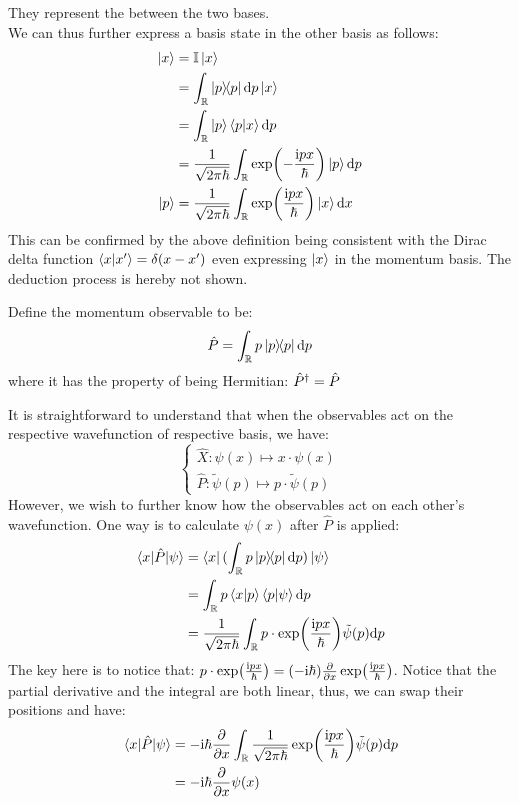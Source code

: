 They represent the  between the two bases. \\
We can thus further express a basis state in the other basis as follows:
\begin{align*}
    \ketx &= \id \ketx \\
    &= \intR \dyad{p} \dd p \ketx \\
    &= \intR \ket{p}\braket{p}{x} \dd p \\
    &= \frac{1}{\sqrt{2\pi\hbar}} \intR \exp(-\frac{\imag p x}{\hbar}) \ket{p} \dd p \\
    \ket{p} &= \frac{1}{\sqrt{2\pi\hbar}} \intR \exp(\frac{\imag p x}{\hbar}) \ket{x} \dd x
\end{align*}
This can be confirmed by the above definition being consistent with the Dirac delta function $\braket{x}{x'} = \delta(x-x')$ even expressing $\ket{x}$ in the momentum basis. The deduction process is hereby not shown.
\begin{definition}
    Define the momentum observable to be:
    $$\hat{P} = \intR p \dyad{p} \dd p$$
    where it has the property of being Hermitian: $\hat{P}^{\dagger} = \hat{P}$
\end{definition}
It is straightforward to understand that when the observables act on the respective wavefunction of respective basis, we have:
$$\begin{cases}
    \hat{X}: \psi(x) \mapsto x \cdot \psi(x) \\
    \hat{P}: \tilde{\psi}(p) \mapsto p \cdot \tilde{\psi}(p)
\end{cases}$$
However, we wish to further know how the observables act on each other's wavefunction. One way is to calculate $\psi(x)$ after $\hat{P}$ is applied:
\begin{align*}
    \mel{x}{\hat{P}}{\psi} &= \brax (\intR p \dyad{p} \dd p) \ketpsi \\
    &= \intR p \braket{x}{p}\braket{p}{\psi} \dd p \\
    &= \frac{1}{\sqrt{2 \pi \hbar}} \intR p \cdot \exp(\frac{\imag p x}{\hbar}) \tilde{\psi}(p) \dd p
\end{align*}
The key here is to notice that: $p \cdot \exp(\frac{\mathrm{i} p x}{\hbar}) = (-\mathrm{i} \hbar)\pdv{x}\exp(\frac{\mathrm{i} p x}{\hbar})$. Notice that the partial derivative and the integral are both linear, thus, we can swap their positions and have:
\begin{align*}
    \mel{x}{\hat{P}}{\psi} &= -\mathrm{i} \hbar \pdv{x} \int_{\mathbb{R}} \frac{1}{\sqrt{2 \pi \hbar}} \exp(\frac{\mathrm{i} p x}{\hbar}) \tilde{\psi}(p) \dd p \\
    &= -\mathrm{i} \hbar \pdv{x} \psi(x)
\end{align*}
